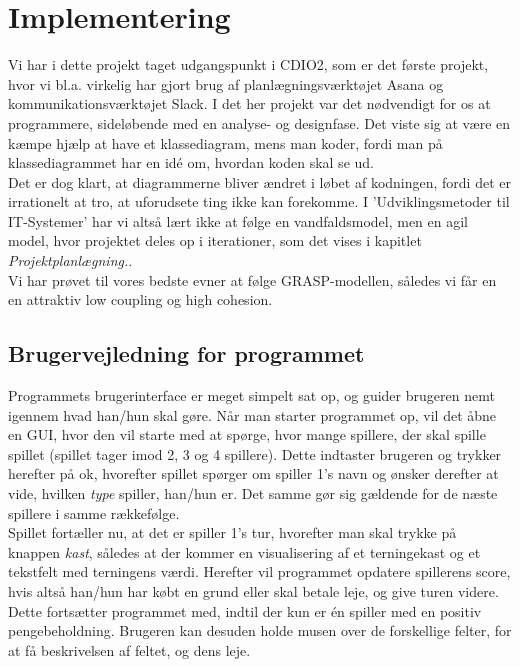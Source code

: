 \chapter{Implementering}
Vi har i dette projekt taget udgangspunkt i CDIO2, som er det første projekt, hvor vi bl.a. virkelig har gjort brug af planlægningsværktøjet Asana og kommunikationsværktøjet Slack.
I det her projekt var det nødvendigt for os at programmere, sideløbende med en analyse- og designfase.
Det viste sig at være en kæmpe hjælp at have et klassediagram, mens man koder, fordi man på klassediagrammet har en idé om, hvordan koden skal se ud.
\\
Det er dog klart, at diagrammerne bliver ændret i løbet af kodningen, fordi det er irrationelt at tro, at uforudsete ting ikke kan forekomme.
I 'Udviklingsmetoder til IT-Systemer' har vi altså lært ikke at følge en vandfaldsmodel, men en agil model, hvor projektet deles op i iterationer, som det vises i kapitlet \textit{Projektplanlægning.}.
\\
Vi har prøvet til vores bedste evner at følge GRASP-modellen, således vi får en en attraktiv low coupling og high cohesion.

\section{Brugervejledning for programmet}
Programmets brugerinterface er meget simpelt sat op, og guider brugeren nemt igennem hvad han/hun skal gøre.
Når man starter programmet op, vil det åbne en GUI, hvor den vil starte med at spørge, hvor mange spillere, der skal spille spillet (spillet tager imod 2, 3 og 4 spillere).
Dette indtaster brugeren og trykker herefter på ok, hvorefter spillet spørger om spiller 1's navn og ønsker derefter at vide, hvilken \textit{type} spiller, han/hun er.
Det samme gør sig gældende for de næste spillere i samme rækkefølge.
\\
Spillet fortæller nu, at det er spiller 1's tur, hvorefter man skal trykke på knappen \textit{kast}, således at der kommer en visualisering af et terningekast og et tekstfelt med terningens værdi.
Herefter vil programmet opdatere spillerens score, hvis altså han/hun har købt en grund eller skal betale leje, og give turen videre.
Dette fortsætter programmet med, indtil der kun er én spiller med en positiv pengebeholdning.
Brugeren kan desuden holde musen over de forskellige felter, for at få beskrivelsen af feltet, og dens leje.